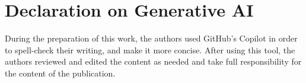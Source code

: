 \documentclass[
]{ceurart}
\begin{document}
\section*{Declaration on Generative AI}


During the preparation of this work,
the authors used GitHub's Copilot in order to spell-check their writing, and make it more concise.
%
After using this tool,
the authors reviewed and edited the content as needed and take full responsibility for the content of the publication.



\end{document}
